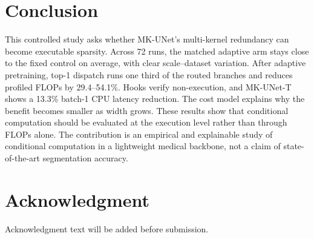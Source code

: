 \documentclass[conference]{IEEEtran}
\begin{document}
\section{Conclusion}
This controlled study asks whether MK-UNet's multi-kernel redundancy can become executable sparsity. Across 72 runs, the matched adaptive arm stays close to the fixed control on average, with clear scale--dataset variation. After adaptive pretraining, top-1 dispatch runs one third of the routed branches and reduces profiled FLOPs by 29.4--54.1\%. Hooks verify non-execution, and MK-UNet-T shows a 13.3\% batch-1 CPU latency reduction. The cost model explains why the benefit becomes smaller as width grows. These results show that conditional computation should be evaluated at the execution level rather than through FLOPs alone. The contribution is an empirical and explainable study of conditional computation in a lightweight medical backbone, not a claim of state-of-the-art segmentation accuracy.

\section*{Acknowledgment}
Acknowledgment text will be added before submission.



\end{document}
